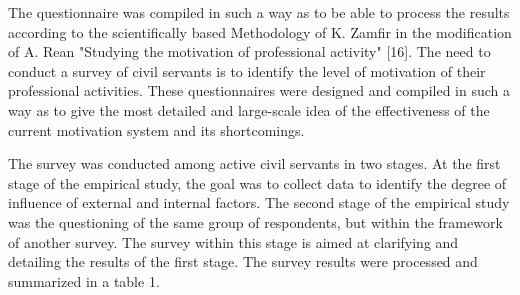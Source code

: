 \begin{multicols}{2}
The questionnaire was compiled in such a way as to be able to process
the results according to the scientifically based Methodology of K.
Zamfir in the modification of A. Rean "Studying the motivation of
professional activity" {[}16{]}. The need to conduct a survey of civil
servants is to identify the level of motivation of their professional
activities. These questionnaires were designed and compiled in such a
way as to give the most detailed and large-scale idea of
\hspace{0pt}\hspace{0pt}the effectiveness of the current motivation
system and its shortcomings.

The survey was conducted among active civil servants in two stages. At
the first stage of the empirical study, the goal was to collect data to
identify the degree of influence of external and internal factors. The
second stage of the empirical study was the questioning of the same
group of respondents, but within the framework of another survey. The
survey within this stage is aimed at clarifying and detailing the
results of the first stage. The survey results were processed and
summarized in a table 1.
\end{multicols}

